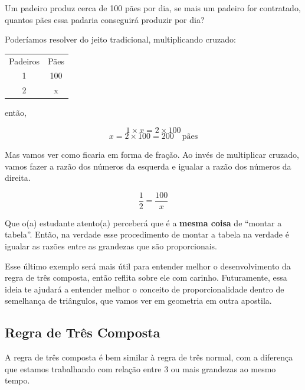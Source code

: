 \begin{exemplo}
    Um padeiro produz cerca de 100 pães por dia, se mais um padeiro for contratado, quantos pães essa padaria conseguirá produzir por dia?

    \vspace{0.5cm}

    Poderíamos resolver do jeito tradicional, multiplicando cruzado:

    \begin{table}[H]
        \centering
        \begin{tabular}{cc}
            Padeiros & Pães \\
            1 & 100\\
            2 & x
        \end{tabular}

    \end{table}


então,

\begin{equation}
    1\times x=2\times100
\end{equation}
\begin{equation}
    x=2\times100=200 \quad \text{pães}
\end{equation}

Mas vamos ver como ficaria em forma de fração. Ao invés de multiplicar cruzado, vamos fazer a razão dos números da esquerda e igualar a razão dos números da direita.

\begin{equation}
    \frac{1}{2}=\frac{100}{x}
\end{equation}

Que o(a) estudante atento(a) perceberá que é a \textbf{mesma coisa} de ``montar a tabela''. Então, na verdade esse procedimento de montar a tabela na verdade é igualar as razões entre as grandezas que são proporcionais.
\end{exemplo}

Esse último exemplo será mais útil para entender melhor o desenvolvimento da regra de três composta, então reflita sobre ele com carinho. Futuramente, essa ideia te ajudará a entender melhor o conceito de proporcionalidade dentro de semelhança de triângulos, que vamos ver em geometria em outra apostila.

\subsection{Regra de Três Composta}
A regra de três composta é bem similar à regra de três normal, com a diferença que estamos trabalhando com relação entre 3 ou mais grandezas ao mesmo tempo.

